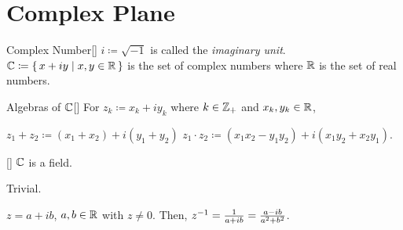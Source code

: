 \documentclass[../complex_variables_1.tex]{subfiles}
\begin{document}
\section{Complex Plane}

\begin{Definition}{Complex Number}[]
    \(i \coloneqq \sqrt{-1}\)
    is called the \emph{imaginary unit}.
    \(\CC \coloneqq \{\,x + iy \mid x, y \in \RR\,\}\) is the set of complex numbers
    where \(\RR\) is the set of real numbers.
\end{Definition}

\begin{Definition}{Algebras of \(\CC\)}[]
    For \(z_k \coloneqq x_k + iy_k\) where \(k \in \ZZ_+\) and \(x_k, y_k \in \RR\),
    \begin{itemize}
        \ii \(z_1 + z_2 \coloneqq (x_1 + x_2) + i(y_1 + y_2)\)
        \ii \(z_1 \cdot z_2 \coloneqq (x_1x_2-y_1y_2)+i(x_1y_2+x_2y_1)\).
    \end{itemize}
\end{Definition}

\begin{Theorem}{}[]
    \(\CC\) is a field.
\end{Theorem}
\begin{myproof}[Proof]
    Trivial.
\end{myproof}

\begin{note}
    \(z = a + ib\), \(a, b \in \RR\) with \(z \neq 0\).
    Then, \(z^{-1} = \frac{1}{a+ib} = \frac{a-ib}{a^2+b^2}\).
\end{note}

\end{document}
